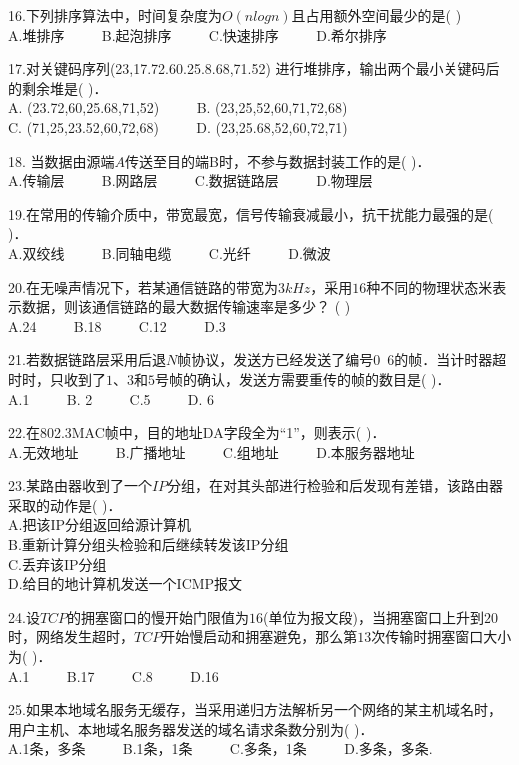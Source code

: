 16.下列排序算法中，时间复杂度为$O(nlogn)$且占用额外空间最少的是(    ) \\
A.堆排序 $\qquad$ B.起泡排序 $\qquad$ C.快速排序 $\qquad$ D.希尔排序

17.对关键码序列(23,17.72.60.25.8.68,71.52) 进行堆排序，输出两个最小关键码后的剩余堆是(    )． \\
A. (23.72,60,25.68,71,52) $\qquad$ B. (23,25,52,60,71,72,68) \\
C. (71,25,23.52,60,72,68) $\qquad$ D. (23,25.68,52,60,72,71)

18. 当数据由源端$A$传送至目的端B时，不参与数据封装工作的是(    )． \\
A.传输层 $\qquad$ B.网路层 $\qquad$ C.数据链路层 $\qquad$ D.物理层

19.在常用的传输介质中，带宽最宽，信号传输衰减最小，抗干扰能力最强的是(    )． \\
A.双绞线 $\qquad$ B.同轴电缆 $\qquad$ C.光纤 $\qquad$ D.微波

20.在无噪声情况下，若某通信链路的带宽为$3kHz$，采用$16$种不同的物理状态米表示数据，则该通信链路的最大数据传输速率是多少？ (    ) \\
A.24 $\qquad$ B.18 $\qquad$ C.12 $\qquad$ D.3

21.若数据链路层采用后退$N$帧协议，发送方已经发送了编号$0$~$6$的帧．当计时器超时时，只收到了$1$、$3$和$5$号帧的确认，发送方需要重传的帧的数目是(    )． \\
A.1 $\qquad$ B. 2 $\qquad$ C.5 $\qquad$ D. 6

22.在802.3MAC帧中，目的地址DA字段全为“1”，则表示(    )． \\
A.无效地址 $\qquad$ B.广播地址 $\qquad$ C.组地址 $\qquad$ D.本服务器地址

23.某路由器收到了一个$IP$分组，在对其头部进行检验和后发现有差错，该路由器采取的动作是(    )． \\
A.把该IP分组返回给源计算机 \\
B.重新计算分组头检验和后继续转发该IP分组 \\
C.丢弃该IP分组 \\
D.给目的地计算机发送一个ICMP报文

24.设$TCP$的拥塞窗口的慢开始门限值为$16$(单位为报文段)，当拥塞窗口上升到$20$时，网络发生超时，$TCP$开始慢启动和拥塞避免，那么第$13$次传输时拥塞窗口大小为(    )． \\
A.1 $\qquad$ B.17 $\qquad$ C.8 $\qquad$ D.16

25.如果本地域名服务无缓存，当采用递归方法解析另一个网络的某主机域名时，用户主机、本地域名服务器发送的域名请求条数分别为(    )． \\
A.1条，多条 $\qquad$ B.1条，1条 $\qquad$ C.多条，1条 $\qquad$ D.多条，多条.

